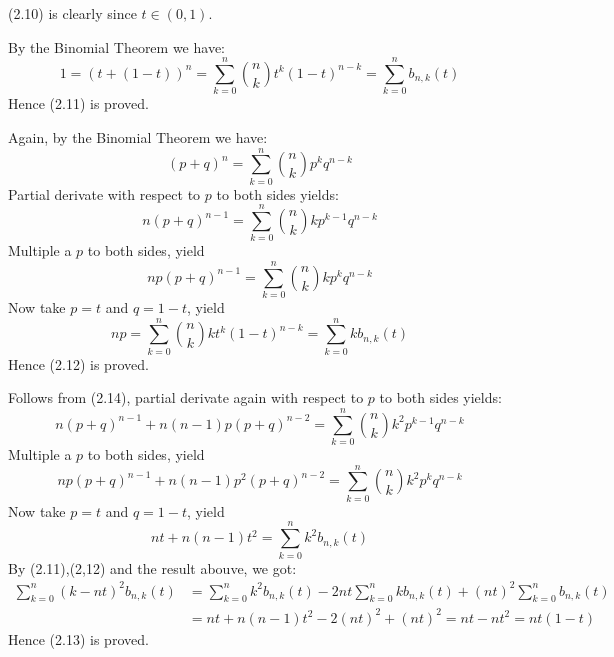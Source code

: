 \documentclass[11pt]{elegantbook}
\begin{document}
\begin{solution}
  (2.10) is clearly since $t\in(0,1)$.
  
  By the Binomial Theorem we have:
  \begin{equation*}
    1 = (t+(1-t))^n = \sum_{k=0}^n \binom{n}{k}t^k(1-t)^{n-k} = \sum_{k=0}^n b_{n,k}(t)
  \end{equation*}
  Hence (2.11) is proved.

  Again, by the Binomial Theorem we have:
  \begin{equation*}
    (p+q)^n=\sum_{k=0}^n \binom{n}{k}p^k q^{n-k}
  \end{equation*}
  Partial derivate with respect to $p$ to both sides yields:
  \begin{equation*}
    n(p+q)^{n-1}=\sum_{k=0}^n \binom{n}{k}kp^{k-1} q^{n-k}
  \end{equation*}
  Multiple a $p$ to both sides, yield
  \begin{equation}
    np(p+q)^{n-1}=\sum_{k=0}^n \binom{n}{k}kp^k q^{n-k}
  \end{equation}
  Now take $p=t$ and $q=1-t$, yield
  \begin{equation*}
    np=\sum_{k=0}^n \binom{n}{k}kt^k (1-t)^{n-k} = \sum_{k=0}^n kb_{n,k}(t)
  \end{equation*}
  Hence (2.12) is proved.

  Follows from (2.14), partial derivate again with respect to $p$ to both sides yields:
  \begin{equation*}
    n(p+q)^{n-1} + n(n-1)p(p+q)^{n-2} =\sum_{k=0}^n \binom{n}{k}k^2p^{k-1} q^{n-k}
  \end{equation*}
  Multiple a $p$ to both sides, yield
  \begin{equation*}
    np(p+q)^{n-1} + n(n-1)p^2(p+q)^{n-2} =\sum_{k=0}^n \binom{n}{k}k^2p^k q^{n-k}
  \end{equation*}
  Now take $p=t$ and $q=1-t$, yield
  \begin{equation*}
    nt + n(n-1)t^2 = \sum_{k=0}^n k^2 b_{n,k}(t)
  \end{equation*}
  By (2.11),(2,12) and the result abouve, we got:
  \begin{align*}
    \sum_{k=0}^n (k-nt)^2b_{n,k}(t) &= \sum_{k=0}^n k^2b_{n,k}(t) - 2nt\sum_{k=0}^n kb_{n,k}(t) + (nt)^2\sum_{k=0}^n b_{n,k}(t)\\
    &= nt + n(n-1)t^2 - 2(nt)^2 + (nt)^2 = nt - nt^2 = nt(1-t)
  \end{align*}
  Hence (2.13) is proved.
\end{solution}
\end{document}
